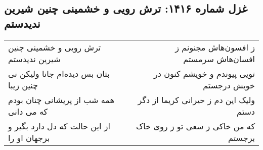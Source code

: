 \begin{center}
\section*{غزل شماره ۱۴۱۶: ترش رویی و خشمینی چنین شیرین ندیدستم}
\label{sec:1416}
\begin{longtable}{l p{0.5cm} r}
ترش رویی و خشمینی چنین شیرین ندیدستم
&&
ز افسون‌هاش مجنونم ز افسان‌هاش سرمستم
\\
بتان بس دیده‌ام جانا ولیکن نی چنین زیبا
&&
تویی پیوندم و خویشم کنون در خویش درجستم
\\
همه شب از پریشانی چنان بودم که می دانی
&&
ولیک این دم ز حیرانی کریما از دگر دستم
\\
از این حالت که دل دارد بگیر و برجهان او را
&&
که من خاکی ز سعی تو ز روی خاک برجستم
\\
\end{longtable}
\end{center}
